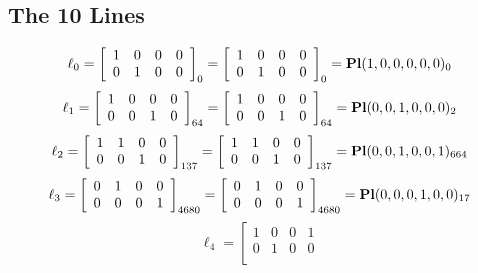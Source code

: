 \documentclass{article}
\begin{document}
{\subsection*{The 10 Lines}
$$
\ell_{0} = 
\left[
\begin{array}{*{4}{r}}
1 & 0 & 0 & 0\\
0 & 1 & 0 & 0\\
\end{array}
\right]
_{0}
=
\left[
\begin{array}{*{4}c}
1  & 0  & 0  & 0\\
0  & 1  & 0  & 0\\
\end{array}
\right]_{0}
={\rm\bf Pl}(1,0,0,0,0,0 )_{0}$$
$$
\ell_{1} = 
\left[
\begin{array}{*{4}{r}}
1 & 0 & 0 & 0\\
0 & 0 & 1 & 0\\
\end{array}
\right]
_{64}
=
\left[
\begin{array}{*{4}c}
1  & 0  & 0  & 0\\
0  & 0  & 1  & 0\\
\end{array}
\right]_{64}
={\rm\bf Pl}(0,0,1,0,0,0 )_{2}$$
$$
\ell_{2} = 
\left[
\begin{array}{*{4}{r}}
1 & 1 & 0 & 0\\
0 & 0 & 1 & 0\\
\end{array}
\right]
_{137}
=
\left[
\begin{array}{*{4}c}
1  & 1  & 0  & 0\\
0  & 0  & 1  & 0\\
\end{array}
\right]_{137}
={\rm\bf Pl}(0,0,1,0,0,1 )_{664}$$
$$
\ell_{3} = 
\left[
\begin{array}{*{4}{r}}
0 & 1 & 0 & 0\\
0 & 0 & 0 & 1\\
\end{array}
\right]
_{4680}
=
\left[
\begin{array}{*{4}c}
0  & 1  & 0  & 0\\
0  & 0  & 0  & 1\\
\end{array}
\right]_{4680}
={\rm\bf Pl}(0,0,0,1,0,0 )_{17}$$
$$
\ell_{4} = 
\left[
\begin{array}{*{4}{r}}
1 & 0 & 0 & 1\\
0 & 1 & 0 & 0\\
\end{array}
$$}
\end{document}
